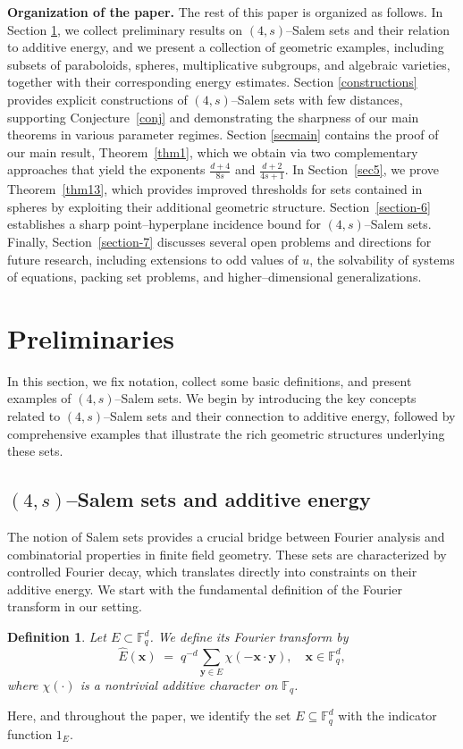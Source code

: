 \documentclass[11pt]{article}
\newtheorem{definition}[theorem]{Definition}
\def\F{\mathbb{F}}
\begin{document}
\noindent\textbf{Organization of the paper.} The rest of this paper is organized as follows. In Section \ref{sec2}, we collect preliminary results on $(4,s)$--Salem sets and their relation to additive energy, and we present a collection of geometric examples, including subsets of paraboloids, spheres, multiplicative subgroups, and algebraic varieties, together with their corresponding energy estimates. Section \ref{constructions} provides explicit constructions of $(4,s)$--Salem sets with few distances, supporting Conjecture~\ref{conj} and demonstrating the sharpness of our main theorems in various parameter regimes. Section \ref{secmain} contains the proof of our main result, Theorem~\ref{thm1}, which we obtain via two complementary approaches that yield the exponents $\frac{d+4}{8s}$ and $\frac{d+2}{4s+1}$. In Section~\ref{sec5}, we prove Theorem~\ref{thm13}, which provides improved thresholds for sets contained in spheres by exploiting their additional geometric structure. Section~\ref{section-6} establishes a sharp point--hyperplane incidence bound for $(4,s)$--Salem sets. Finally, Section~\ref{section-7} discusses several open problems and directions for future research, including extensions to odd values of $u$, the solvability of systems of equations, packing set problems, and higher--dimensional generalizations.




\section{Preliminaries} \label{sec2}
In this section, we fix notation, collect some basic definitions, and present examples of $(4, s)$--Salem sets. We begin by introducing the key concepts related to $(4,s)$--Salem sets and their connection to additive energy, followed by comprehensive examples that illustrate the rich geometric structures underlying these sets.
\subsection{$(4, s)$--Salem sets and additive energy}

The notion of Salem sets provides a crucial bridge between Fourier analysis and combinatorial properties in finite field geometry. These sets are characterized by controlled Fourier decay, which translates directly into constraints on their additive energy. We start with the fundamental definition of the Fourier transform in our setting.

\begin{definition}
	Let $E\subset\mathbb{F}_q^d$. We define its Fourier transform by
	\begin{equation*}
		\widehat{E}(\mathbf{x}) \;=\; q^{-d}\sum_{\mathbf{y}\in E} \chi(-\mathbf{x} \cdot \mathbf{y}),
		\quad \mathbf{x}\in\mathbb{F}_q^d,
	\end{equation*}
	where $\chi(\cdot )$ is a nontrivial additive character on $\F_q$.
\end{definition}
Here, and throughout the paper,  we identify the set $E\subseteq \mathbb F_q^d$ with the indicator function $1_E$.
\end{document}
